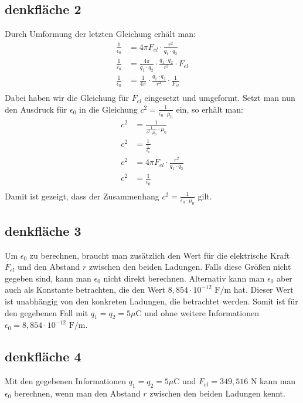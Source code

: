\documentclass{report}
\begin{document}
\subsection{denkfläche 2}
Durch Umformung der letzten Gleichung erhält man:
\begin{align}
\frac{1}{\epsilon_0} &= 4\pi F_{el} \cdot \frac{r^2}{q_1 \cdot q_2} \\
\frac{1}{\epsilon_0} &= \frac{4\pi}{q_1 \cdot q_2} \cdot \frac{q_1 \cdot q_2}{r^2} \cdot F_{el} \\
\frac{1}{\epsilon_0} &= \frac{1}{4\pi} \cdot \frac{q_1 \cdot q_2}{r^2} \cdot \frac{1}{F_{el}} \\
\end{align}
Dabei haben wir die Gleichung für $F_{el}$ eingesetzt und umgeformt.
Setzt man nun den Ausdruck für $\epsilon_0$ in die Gleichung $c^2 = \frac{1}{\epsilon_0 \cdot \mu_0}$ ein, so erhält man:
\begin{align}
c^2 &= \frac{1}{\frac{1}{c^2\cdot \mu_0} \cdot \mu_0} \\
c^2 &= \frac{1}{\frac{1}{\epsilon_0}} \\
c^2 &= 4\pi F_{el} \cdot \frac{r^2}{q_1 \cdot q_2} \\
c^2 &= \frac{1}{\epsilon_0} \\
\end{align}
Damit ist gezeigt, dass der Zusammenhang $c^2 = \frac{1}{\epsilon_0 \cdot \mu_0}$ gilt.
\subsection{denkfläche 3}
Um $\epsilon_0$ zu berechnen, braucht man zusätzlich den Wert für die
elektrische Kraft $F_{el}$ und den Abstand $r$ zwischen den beiden Ladungen.
Falls diese Größen nicht gegeben sind, kann man $\epsilon_0$ nicht direkt
berechnen.
Alternativ kann man $\epsilon_0$ aber auch als Konstante betrachten, die den
Wert $8,854 \cdot 10^{-12} \text{ F/m}$ hat. Dieser Wert ist unabhängig von den
konkreten Ladungen, die betrachtet werden.
Somit ist für den gegebenen Fall mit $q_1=q_2=5\mu\text{C}$ und ohne weitere
Informationen $\epsilon_0=8,854 \cdot 10^{-12} \text{ F/m}$.
\subsection{denkfläche 4}
Mit den gegebenen Informationen $q_1=q_2=5\mu\text{C}$ und
$F_{el}=349,516\text{ N}$ kann man $\epsilon_0$ berechnen, wenn man den Abstand
$r$ zwischen den beiden Ladungen kennt.
\end{document}
